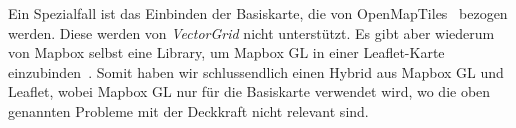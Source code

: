 Ein Spezialfall ist das Einbinden der Basiskarte, die von OpenMapTiles~\cite{openmaptiles} bezogen werden.
Diese werden von \emph{VectorGrid} nicht unterstützt.
Es gibt aber wiederum von Mapbox selbst eine Library, um Mapbox GL in einer Leaflet-Karte einzubinden~\cite{mapbox_gl_leaflet}.
Somit haben wir schlussendlich einen Hybrid aus Mapbox GL und Leaflet, wobei Mapbox GL nur für die Basiskarte verwendet wird, wo die oben genannten Probleme mit der Deckkraft nicht relevant sind.
